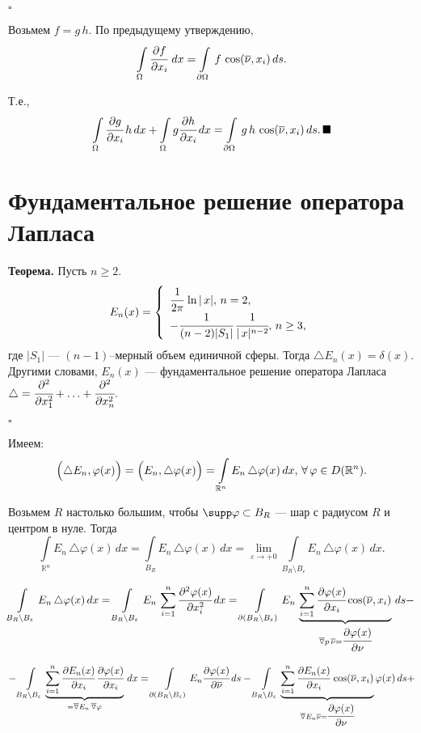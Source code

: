 \documentclass[12pt,a4paper,draft]{article}
\DeclareRobustCommand*{\т}{~--- }
\DeclareRobustCommand*{\ч}{~-- }
\begin{document}
$\square$

Возьмем $f=g\,h$. По предыдущему утверждению,
$$\int\limits_{\Omega}\cfrac{\partial f}{\partial
x_i}\,\,dx=
\int\limits_{\partial\Omega}\,f\,\cos(\overline{\nu},x_i)\,ds.$$

Т.е.,
$$\int\limits_{\Omega}\cfrac{\partial g}{\partial
x_i}\,h\,dx+\int\limits_{\Omega}g\cfrac{\partial h}{\partial
x_i}\,dx=
\int\limits_{\partial\Omega}\,g\,h\,\cos(\overline{\nu},x_i)\,ds.\,\blacksquare$$

\section{Фундаментальное решение оператора Лапласа}

\textbf{Теорема.} Пусть $n\ge2$.
$$E_n(x)=\left\{%
\begin{array}{ll}
    \cfrac1{2\pi}\,\ln|\,x|,\,n=2,      \\
    -\cfrac1{(n-2)|S_1|}\,\cfrac1{|\,x|^{n-2}},\,n\ge3, \\
\end{array}%
\right.    $$ где $|S_1|$ --- $(n-1)$--мерный объем единичной
сферы. Тогда $\triangle E_n(x)=\delta(x).$ Другими словами,
$E_n(x)$ --- фундаментальное решение оператора Лапласа $\triangle
=\cfrac{\partial^2 }{\partial x_1^2}+\ldots+\cfrac{\partial^2
}{\partial x_n^2}.$

$\square$

Имеем: $$\Bigl(\triangle E_n,\varphi(x)\Bigr)=
\Bigl(E_n,\triangle\varphi(x)\Bigr)= \int\limits_{\mathbb
R^n}E_n\,\triangle\varphi(x)\,dx,\,\forall \,\varphi \in D(\mathbb
R^n).$$

Возьмем $R$ настолько большим, чтобы $\supp \varphi\subset B_R$
--- шар с радиусом $R$ и центром в нуле. Тогда
$$\int\limits_{\mathbb
R^n}E_n\,\triangle\varphi(x)\,dx=
\int\limits_{B_R}E_n\,\triangle\varphi(x)\,dx=
\lim_{\varepsilon\to+0}\int\limits_{B_R\setminus
B_{\varepsilon}}E_n\,\triangle\varphi(x)\,dx.$$

$$\int\limits_{B_R\setminus
B_{\varepsilon}}E_n\,\triangle\varphi(x)\,dx=
\int\limits_{B_R\setminus
B_{\varepsilon}}E_n\,\sum_{i=1}^n\cfrac{\partial^2\varphi(x)}{\partial
x_i^2}\,dx= \int\limits_{\partial (B_R\setminus
B_{\varepsilon})}E_n\,\underbrace{\sum_{i=1}^n\cfrac{\partial\varphi(x)}{\partial
x_i}\cos(\overline{\nu},x_i)}_{\overline{\triangledown}
p\,\overline{\nu}=\cfrac{\partial\varphi(x)}{\partial \nu}}\,ds-$$

$$-\int\limits_{B_R\setminus
B_{\varepsilon}}\underbrace{\sum_{i=1}^n\cfrac{\partial
E_n(x)}{\partial x_i}\,\cfrac{\partial\varphi(x)}{\partial
x_i}}_{=\overline{\triangledown}E_n\,\overline{\triangledown}\varphi}\,dx=
\int\limits_{\partial (B_R\setminus
B_{\varepsilon})}E_n\cfrac{\partial\varphi(x)}{\partial
\overline{\nu}}\,ds- \int\limits_{B_R\setminus
B_{\varepsilon}}\underbrace{\sum_{i=1}^n\cfrac{\partial
E_n(x)}{\partial
x_i}\,\cos(\overline{\nu},x_i)}_{\overline{\triangledown}
E_n\overline{\nu}=\cfrac{\partial\varphi(x)}{\partial
\nu}}\varphi(x)\,ds+$$
\end{document}
